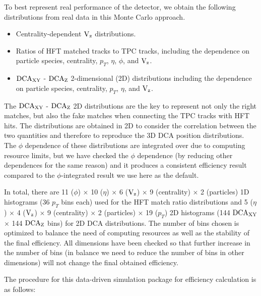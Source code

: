 \documentclass[%
 reprint,	
 amsmath,amssymb,
 aps,
 prc,
]{revtex4-1}
\begin{document}
To best represent real performance of the detector, we obtain the following distributions from real data in this Monte Carlo approach.
\begin{itemize}
\item Centrality-dependent $\textup{V}_\textup{z}$ distributions.
\item Ratios of HFT matched tracks to TPC tracks, including the dependence on particle species, centrality, $p_T$, $\eta$, $\phi$, and $\textup{V}_\textup{z}$.
\item $\textup{DCA}_{\textup{XY}}$ - $\textup{DCA}_{\textup{Z}}$ 2-dimensional (2D) distributions including the dependence on particle species, centrality, $p_T$, $\eta$, and $\textup{V}_\textup{z}$.
\end{itemize}
The $\textup{DCA}_{\textup{XY}}$ - $\textup{DCA}_{\textup{Z}}$ 2D distributions are the key to represent not only the right matches, but also the fake matches when connecting the TPC tracks with HFT hits. The distributions are obtained in 2D to consider the correlation between the two quantities and therefore to reproduce the 3D DCA position distributions. The $\phi$ dependence of these distributions are integrated over due to computing resource limits, but we have checked the $\phi$ dependence (by reducing other dependences for the same reason) and it produces a consistent efficiency result compared to the $\phi$-integrated result we use here as the default.

In total, there are 11 ($\phi$) $\times$ 10 ($\eta$) $\times$ 6 ($\textup{V}_\textup{z}$) $\times$ 9 (centrality) $\times$ 2 (particles) 1D histograms (36 $p_T$ bins each) used for the HFT match ratio distributions and 5 ($\eta$) $\times$ 4 ($\textup{V}_\textup{z}$) $\times$ 9 (centrality) $\times$ 2 (particles) $\times$ 19 ($p_T$) 2D histograms (144 $\textup{DCA}_{\textup{XY}}$ $\times$ 144 $\textup{DCA}_{\textup{Z}}$ bins) for 2D DCA distributions. The number of bins chosen is optimized to balance the need of computing resources as well as the stability of the final efficiency. All dimensions have been checked so that further increase in the number of bins (in balance we need to reduce the number of bins in other dimensions)  will not change the final obtained efficiency.

The procedure for this data-driven simulation package for efficiency calculation is as follows:
\end{document}
